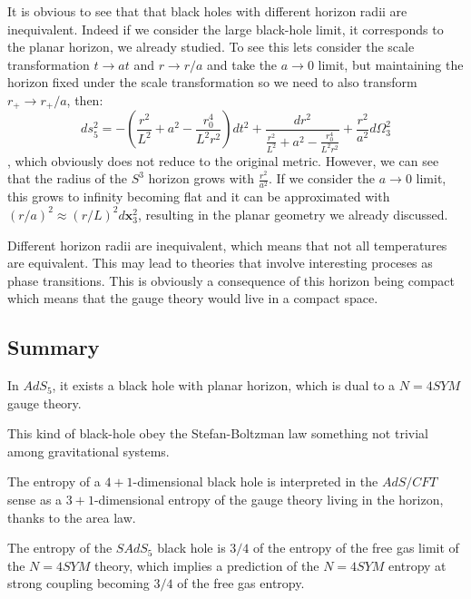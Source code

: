\documentclass[12pt]{article}
\begin{document}
It is obvious to see that that black holes with different horizon radii are inequivalent. Indeed if we consider the large black-hole limit, it corresponds to the planar horizon, we already studied. To see this lets consider the scale transformation $t\rightarrow at$ and $r\rightarrow r/a$ and take the $a\rightarrow 0$ limit, but maintaining the horizon fixed under the scale transformation so we need to also transform $r_+\rightarrow r_+/a$, then:
\[
    ds_5^2 = -\left(\frac{r^2}{L^2}+a^2-\frac{r_0^4}{L^2r^2}\right)dt^2+\frac{dr^2}{\frac{r^2}{L^2}+a^2-\frac{r_0^4}{L^2r^2}}+\frac{r^2}{a^2} d\Omega_3^2
\]
, which obviously does not reduce to the original metric. However, we can see that the radius of the $S^3$ horizon grows with $\frac{r^2}{a^2}$. If we consider the $a\rightarrow 0$ limit, this grows to infinity becoming flat and it can be approximated with $(r/a)^2\approx (r/L)^2d\mathbf{x}_3^2$, resulting in the planar geometry we already discussed. 

\vspace{.25cm}

Different horizon radii are inequivalent, which means that not all temperatures are equivalent. This may lead to theories that involve interesting proceses as phase transitions. This is obviously a consequence of this horizon being compact which means that the gauge theory would live in a compact space.

\subsection{Summary}

In $AdS_5$, it exists a black hole with planar horizon, which is dual to a $N=4SYM$ gauge theory.

\vspace{.25cm}

This kind of black-hole obey the Stefan-Boltzman law something not trivial among gravitational systems.

\vspace{.25cm}

The entropy of a $4+1$-dimensional black hole is interpreted in the $AdS/CFT$ sense as a $3+1$-dimensional entropy of the gauge theory living in the horizon, thanks to the area law.

\vspace{.25cm}

The entropy of the $SAdS_5$ black hole is $3/4$ of the entropy of the free gas limit of the $N=4SYM$ theory, which implies a prediction of the $N=4SYM$ entropy at strong coupling becoming $3/4$ of the free gas entropy.
\end{document}

